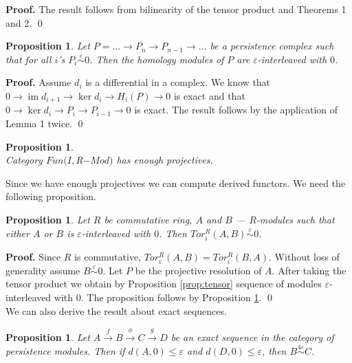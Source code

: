 \documentclass[a4paper, 12pt]{article}
\newcounter{stmcounter}[section]
\numberwithin{equation}{section}
\newtheorem{proposition}[stmcounter]{Proposition}
\theoremstyle{definition}
\theoremstyle{remark}
\newenvironment{pf}{\noindent\textbf{Proof.}}{\qed}
\renewcommand{\leq}{\leqslant}
\begin{document}
\begin{pf}
  The result follows from bilinearity of the tensor product and Theorems 1 and 2.
\end{pf}

\begin{proposition}
  \label{prop:hominter}
  Let $P = \ldots \to P_n \to P_{n-1} \to \ldots$ be a persistence complex such that for all $i$'s $P_i \stackrel{\varepsilon}{\sim} 0$. Then the homology modules of $P$ are $\varepsilon$-interleaved with $0$.
\end{proposition}

\begin{pf}
  Assume $d_i$ is a differential in a complex. We know that $0 \to \operatorname{im}{d_{i+1}} \to \ker{d_{i}} \to H_i(P) \to 0$ is exact and that $0 \to \ker{d_i} \to P_i \to P_{i-1} \to 0$ is exact. The result follows by the application of Lemma 1 twice.
\end{pf}\\

\begin{proposition} {\cite[Page 2]{Mitchell81}}\\
  Category $Fun(I, $R$-Mod)$ has enough projectives.
\end{proposition}

Since we have enough projectives we can compute derived functors. We need the following proposition.\\

\begin{proposition}
  \label{prop:tor}
  Let $R$ be commutative ring, $A$ and $B$ --- $R$-modules such that either $A$ or $B$ is $\varepsilon$-interleaved with $0$. Then $Tor_i^R(A,B) \stackrel{\varepsilon}{\sim} 0$.
\end{proposition}

\begin{pf}
  Since $R$ is commutative, $Tor_i^R(A,B) = Tor_i^R(B,A)$. Without loss of generality assume $B \stackrel{\varepsilon}{\sim} 0$. Let $P$ be the projective resolution of $A$. After taking the tensor product we obtain by Proposition \ref{prop:tensor} sequence of modules $\varepsilon$-interleaved with $0$. The proposition follows by Proposition \ref{prop:hominter}.
\end{pf}\\

We can also derive the result about exact sequences.\\

\begin{proposition}
  \label{major}
  Let $A \xrightarrow{f} B \xrightarrow{\phi} C \xrightarrow{g} D$ be an exact sequence in the category of persistence modules. Then if $d(A,0) \leq \varepsilon$ and $d(D,0) \leq \varepsilon$, then $B \stackrel{4\varepsilon}{\sim} C$.
\end{proposition}
\end{document}
